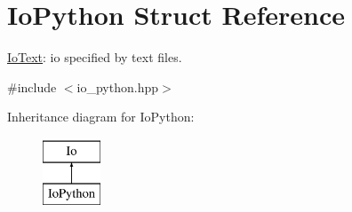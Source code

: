 \hypertarget{structIoPython}{}\section{Io\+Python Struct Reference}
\label{structIoPython}


\mbox{\hyperlink{structIoText}{Io\+Text}}\+: io specified by text files.  




{\ttfamily \#include $<$io\+\_\+python.\+hpp$>$}

Inheritance diagram for Io\+Python\+:\begin{figure}[H]
\begin{center}
\leavevmode
\includegraphics[height=2.000000cm]{structIoPython}
\end{center}
\end{figure}
